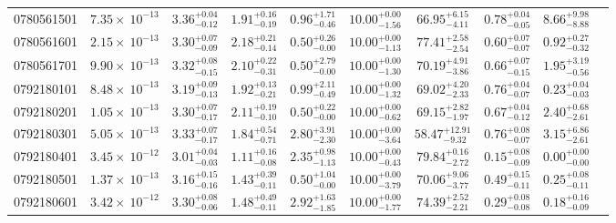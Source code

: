 \documentclass{article}
\begin{document}
\begin{landscape}
\begin{longtable}{cccccccccl}
0780561501 & $7.35 \times~10^{-13}$ & $3.36^{+0.04}_{-0.12}$ & $1.91^{+0.16}_{-0.19}$ & $0.96^{+1.71}_{-0.46}$ & $10.00^{+0.00}_{-1.56}$ & $66.95^{+6.15}_{-4.11}$ &  $0.78^{+0.04}_{-0.05}$ &  $8.66^{+9.98}_{-8.88}$  \\
0780561601 & $2.15 \times~10^{-13}$ & $3.30^{+0.07}_{-0.09}$ & $2.18^{+0.21}_{-0.14}$ & $0.50^{+0.26}_{-0.00}$ & $10.00^{+0.00}_{-1.13}$ & $77.41^{+2.58}_{-2.54}$ &  $0.60^{+0.07}_{-0.07}$ &  $0.92^{+0.27}_{-0.32}$  \\
0780561701 & $9.90 \times~10^{-13}$ & $3.32^{+0.08}_{-0.15}$ & $2.10^{+0.22}_{-0.31}$ & $0.50^{+2.79}_{-0.00}$ & $10.00^{+0.00}_{-1.30}$ & $70.19^{+4.91}_{-3.86}$ &  $0.66^{+0.07}_{-0.15}$ &  $1.95^{+3.19}_{-0.56}$  \\
0792180101 & $8.48 \times~10^{-13}$ & $3.19^{+0.09}_{-0.13}$ & $1.92^{+0.13}_{-0.21}$ & $0.99^{+2.11}_{-0.49}$ & $10.00^{+0.00}_{-1.32}$ & $69.02^{+4.20}_{-2.33}$ &  $0.76^{+0.04}_{-0.07}$ &  $0.23^{+0.04}_{-0.03}$  \\
0792180201 & $1.05 \times~10^{-13}$ & $3.30^{+0.07}_{-0.17}$ & $2.11^{+0.19}_{-0.10}$ & $0.50^{+0.22}_{-0.00}$ & $10.00^{+0.00}_{-0.62}$ & $69.15^{+2.82}_{-1.97}$ &  $0.67^{+0.04}_{-0.12}$ &  $2.40^{+0.68}_{-2.61}$  \\
0792180301 & $5.05 \times~10^{-13}$ & $3.33^{+0.07}_{-0.17}$ & $1.84^{+0.54}_{-0.71}$ & $2.80^{+3.91}_{-2.30}$ & $10.00^{+0.00}_{-3.64}$ & $58.47^{+12.91}_{-9.32}$ &  $0.76^{+0.08}_{-0.07}$ &  $3.15^{+6.86}_{-2.61}$  \\
0792180401 & $3.45 \times~10^{-12}$ & $3.01^{+0.04}_{-0.03}$ & $1.11^{+0.16}_{-0.08}$ & $2.35^{+0.98}_{-1.13}$ & $10.00^{+0.00}_{-0.43}$ & $79.84^{+0.16}_{-2.72}$ &  $0.15^{+0.08}_{-0.09}$ &  $0.00^{+0.00}_{-0.00}$  \\ 
0792180501 & $1.37 \times~10^{-13}$ & $3.16^{+0.15}_{-0.16}$ & $1.43^{+0.39}_{-0.11}$ & $0.50^{+1.04}_{-0.00}$ & $10.00^{+0.00}_{-3.79}$ & $70.06^{+9.06}_{-3.77}$ &  $0.49^{+0.15}_{-0.11}$ &  $0.25^{+0.08}_{-0.11}$  \\
0792180601 & $3.42 \times~10^{-12}$ & $3.30^{+0.08}_{-0.06}$ & $1.48^{+0.49}_{-0.11}$ & $2.92^{+1.63}_{-1.85}$ & $10.00^{+0.00}_{-1.77}$ & $74.39^{+2.52}_{-2.21}$ &  $0.29^{+0.08}_{-0.08}$ &  $0.18^{+0.16}_{-0.09}$  \\
\end{longtable}

\end{landscape}
\end{document}
